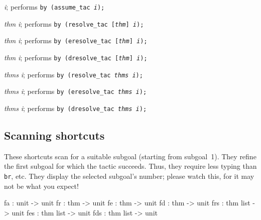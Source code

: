 \begin{ttdescription}
\item[\ttindexbold{ba} {\it i};] 
performs \hbox{\tt by (assume_tac {\it i});}

\item[\ttindexbold{br} {\it thm} {\it i};] 
performs \hbox{\tt by (resolve_tac [{\it thm}] {\it i});}

\item[\ttindexbold{be} {\it thm} {\it i};] 
performs \hbox{\tt by (eresolve_tac [{\it thm}] {\it i});}

\item[\ttindexbold{bd} {\it thm} {\it i};] 
performs \hbox{\tt by (dresolve_tac [{\it thm}] {\it i});}

\item[\ttindexbold{brs} {\it thms} {\it i};] 
performs \hbox{\tt by (resolve_tac {\it thms} {\it i});}

\item[\ttindexbold{bes} {\it thms} {\it i};] 
performs \hbox{\tt by (eresolve_tac {\it thms} {\it i});}

\item[\ttindexbold{bds} {\it thms} {\it i};] 
performs \hbox{\tt by (dresolve_tac {\it thms} {\it i});}
\end{ttdescription}


\subsection{Scanning shortcuts}
These shortcuts scan for a suitable subgoal (starting from subgoal~1).
They refine the first subgoal for which the tactic succeeds.  Thus, they
require less typing than {\tt br}, etc.  They display the selected
subgoal's number; please watch this, for it may not be what you expect!

\begin{ttbox} 
fa  : unit     -> unit
fr  : thm      -> unit
fe  : thm      -> unit
fd  : thm      -> unit
frs : thm list -> unit
fes : thm list -> unit
fds : thm list -> unit
\end{ttbox}

